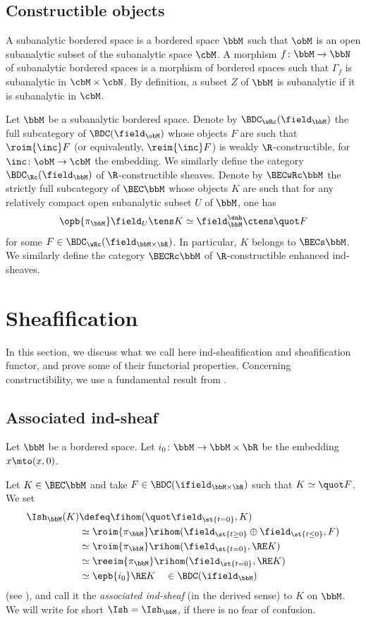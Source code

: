 \subsection{Constructible objects}
A subanalytic bordered space is a bordered space $\bbM$ such that $\obM$ is an open subanalytic subset of the subanalytic space $\cbM$. A morphism $f\colon\bbM\to\bbN$ of subanalytic bordered spaces is a morphism of bordered spaces such that $\Gamma_f$ is subanalytic in $\cbM\times\cbN$.
By definition, a subset $Z$ of $\bbM$ is subanalytic if it is subanalytic in $\cbM$.


Let $\bbM$ be a subanalytic bordered space. Denote by $\BDC_\wRc(\field_\bbM)$ the full subcategory of $\BDC(\field_\obM)$ whose objects $F$ are such that $\roim{{\inc}} F$ (or equivalently, $\reim{{\inc}} F$) is weakly $\R$-constructible, for $\inc\colon \obM\to\cbM$ the embedding.
We similarly define the category $\BDC_\Rc(\field_\bbM)$ of $\R$-constructible sheaves. Denote by
$\BECwRc\bbM$ the strictly full subcategory of $\BEC\bbM$ whose objects $K$
are such that for any relatively compact open subanalytic subset $U$ of $\bbM$,
one has
\[
\opb{\pi_\bbM}\field_U\tens K \simeq \field_\bbM^\enh \ctens \quot F
\]
for some $F\in \BDC_\wRc(\field_{\bbM\times\bR})$.
In particular, $K$ belongs to $\BECs\bbM$.
We similarly define the category $\BECRc\bbM$ of $\R$-constructible enhanced ind-sheaves.

\section{Sheafification}\label{se:sh}

In this section, we discuss what we call here ind-sheafification and sheafification functor, and prove some of their functorial properties. Concerning constructibility, we use a fundamental result from \cite[\S6]{KS16}.

\subsection{Associated ind-sheaf}

Let $\bbM$ be a bordered space.
Let $i_0\colon\bbM\to\bbM\times\bR$ be the embedding $x\mto(x,0)$.

\begin{definition}
Let $K\in\BEC \bbM$ and take
$F\in\BDC(\ifield_{\bbM\times\bR})$ such that $K\simeq\quot F$.
We set
\begin{align*}
\Ish_\bbM(K) &\defeq \fihom(\quot\field_{\st{t=0}},K) \\
&\simeq \roim{{\pi_\bbM}}\rihom(\field_{\st{t\ge0}}\oplus\field_{\st{t\le0}}, F) \\
&\simeq\roim{{\pi_\bbM}}\rihom(\field_{\st{t=0}}, \RE K) \\
&\simeq \reeim{{\pi_\bbM}}\rihom(\field_{\st{t=0}}, \RE K) \\
&\simeq \epb{i_0}\RE K \quad \in \BDC(\ifield_\bbM)
\end{align*}
(see \cite[Lem.\,4.5.16]{DK16}), and call it the \emph{associated ind-sheaf} (in the derived sense) to $K$ on $\bbM$.
We will write for short $\Ish=\Ish_\bbM$, if there is no fear of confusion.
\end{definition}

